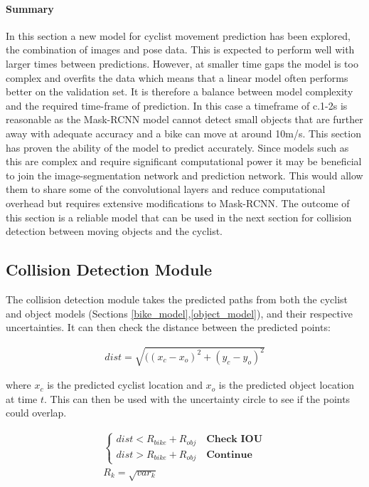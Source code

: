 \documentclass[11pt,twoside]{report}
\begin{document}
\paragraph{Summary}
In this section a new model for cyclist movement prediction has been explored, the combination of images and pose data. This is expected to perform well with larger times between predictions. However, at smaller time gaps the model is too complex and overfits the data which means that a linear model often performs better on the validation set. It is therefore a balance between model complexity and the required time-frame of prediction. In this case a timeframe of c.1-2s is reasonable as the Mask-RCNN model cannot detect small objects that are further away with adequate accuracy and a bike can move at around 10m/s. This section has proven the ability of the model to predict accurately. Since models such as this are complex and require significant computational power it may be beneficial to join the image-segmentation network and prediction network. This would allow them to share some of the convolutional layers and reduce computational overhead but requires extensive modifications to Mask-RCNN. The outcome of this section is a reliable model that can be used in the next section for collision detection between moving objects and the cyclist. 

\subsection{Collision Detection Module}
The collision detection module takes the predicted paths from both the cyclist and object models (Sections \ref{bike_model},\ref{object_model}), and their respective uncertainties. It can then check the distance between the predicted points:

\begin{equation}
\begin{aligned}
dist = \sqrt{( (x_{c}-x_{o})^{2} + (y_{c}-y_{o})^{2}}
\end{aligned}
\label{distance_eq}
\end{equation}

where $x_{c}$ is the predicted cyclist location and $x_{o}$ is the predicted object location at time $t$. This can then be used with the uncertainty circle to see if the points could overlap.

\begin{equation}
\begin{aligned}
\begin{cases}
dist < R_{bike} + R_{obj} \quad \textbf{Check IOU} \\
dist > R_{bike} + R_{obj} \quad \textbf{Continue}
\end{cases} \\
R_{k} = \sqrt{var_{k}}
\end{aligned}
\label{horn_eq}
\end{equation}
\end{document}
